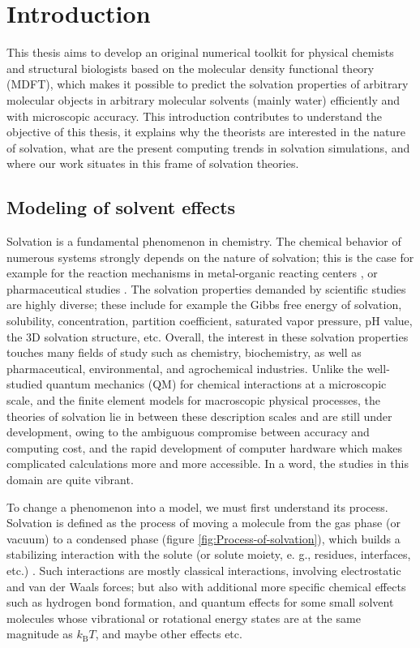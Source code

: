 
\chapter{Introduction\label{chpt:introduction}}

This thesis aims to develop an original numerical toolkit for physical
chemists and structural biologists based on the molecular density
functional theory (\acs{MDFT}), which makes it possible to predict
the solvation properties of arbitrary molecular objects in arbitrary
molecular solvents (mainly water) efficiently and with microscopic
accuracy. This introduction contributes to understand the objective
of this thesis, it explains why the theorists are interested in the
nature of solvation, what are the present computing trends in solvation
simulations, and where our work situates in this frame of solvation
theories.

\section{Modeling of solvent effects}

Solvation is a fundamental phenomenon in chemistry. The chemical behavior
of numerous systems strongly depends on the nature of solvation; this
is the case for example for the reaction mechanisms in metal-organic
reacting centers \citep{Mn-oxo,PCET}, or pharmaceutical studies \citep{drug_1_Perlovich,drug_2_Perlovich,drug_3}.
The solvation properties demanded by scientific studies are highly
diverse; these include for example the Gibbs free energy of solvation,
solubility, concentration, partition coefficient, saturated vapor
pressure, pH value, the 3D solvation structure, etc. Overall, the
interest in these solvation properties touches many fields of study
such as chemistry, biochemistry, as well as pharmaceutical, environmental,
and agrochemical industries. Unlike the well-studied quantum mechanics
(\acs{QM}) for chemical interactions at a microscopic scale, and
the finite element models for macroscopic physical processes, the
theories of solvation lie in between these description scales and
are still under development, owing to the ambiguous compromise between
accuracy and computing cost, and the rapid development of computer
hardware which makes complicated calculations more and more accessible.
In a word, the studies in this domain are quite vibrant.

To change a phenomenon into a model, we must first understand its
process. Solvation is defined as the process of moving a molecule
from the gas phase (or vacuum) to a condensed phase (figure \ref{fig:Process-of-solvation}),
which builds a stabilizing interaction with the solute (or solute
moiety, e. g., residues, interfaces, etc.) \citep{iupac}. Such interactions
are mostly classical interactions, involving electrostatic and van
der Waals forces; but also with additional more specific chemical
effects such as hydrogen bond formation, and quantum effects for some
small solvent molecules whose vibrational or rotational energy states
are at the same magnitude as $k_{\mathrm{B}}T$, and maybe other effects
etc.

